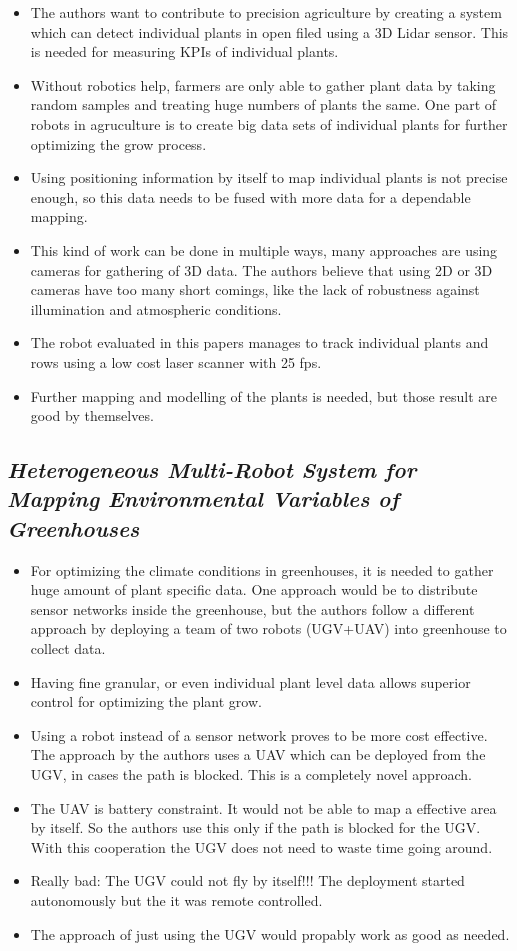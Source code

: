 \documentclass{article}
\begin{document}
\begin{itemize}
  \item The authors want to contribute to precision agriculture by creating a system which can detect individual plants in open filed using a 3D Lidar sensor. This is needed for measuring KPIs of individual plants. 
  \item Without robotics help, farmers are only able to gather plant data by taking random samples and treating huge numbers of plants the same. One part of robots in agruculture is to create big data sets of individual plants for further optimizing the grow process.
  \item Using positioning information by itself to map individual plants is not precise enough, so this data needs to be fused with more data for a dependable mapping.
  \item This kind of work can be done in multiple ways, many approaches are using cameras for gathering of 3D data. The authors believe that using 2D or 3D cameras have too many short comings, like the lack of robustness against illumination and atmospheric conditions.
  \item The robot evaluated in this papers manages to track individual plants and rows using a low cost laser scanner with 25 fps.
  \item Further mapping and modelling of the plants is needed, but those result are good by themselves.
\end{itemize}

\subsection*{\emph{Heterogeneous Multi-Robot System for Mapping Environmental Variables of Greenhouses}}
\cite{Roldan2016}

\begin{itemize}
  \item For optimizing the climate conditions in greenhouses, it is needed to gather huge amount of plant specific data. One approach would be to distribute sensor networks inside the greenhouse, but the authors follow a different approach by deploying a team of two robots (UGV+UAV) into greenhouse to collect data.
  \item Having fine granular, or even individual plant level data allows superior control for optimizing the plant grow. 
  \item Using a robot instead of a sensor network proves to be more cost effective. The approach by the authors uses a UAV which can be deployed from the UGV, in cases the path is blocked. This is a completely novel approach.
  \item The UAV is battery constraint. It would not be able to map a effective area by itself. So the authors use this only if the path is blocked for the UGV. With this cooperation the UGV does not need to waste time going around.
  \item Really bad: The UGV could not fly by itself!!! The deployment started autonomously but the it was remote controlled.
  \item The approach of just using the UGV would propably work as good as needed.
\end{itemize}

 


\end{document}

